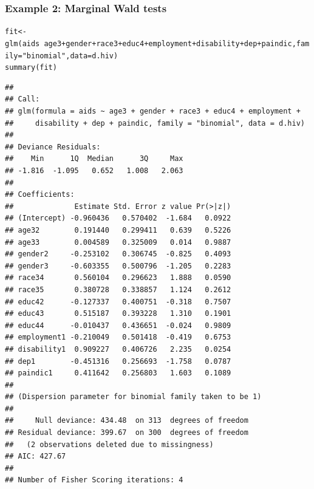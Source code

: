 \documentclass[extsize,handout,10pt]{beamer}\usepackage[]{graphicx}\usepackage[]{color}
\makeatletter
\newcommand{\hlstr}[1]{\textcolor[rgb]{1,0.4,0.2}{#1}}%
\newcommand{\hlopt}[1]{\textcolor[rgb]{0.251,0.251,0.251}{#1}}%
\newcommand{\hlstd}[1]{\textcolor[rgb]{0.251,0.251,0.251}{#1}}%
\newcommand{\hlkwb}[1]{\textcolor[rgb]{0,0.439,0.902}{#1}}%
\newcommand{\hlkwc}[1]{\textcolor[rgb]{0.188,0.941,0.314}{#1}}%
\newcommand{\hlkwd}[1]{\textcolor[rgb]{0.69,0.188,0.941}{#1}}%
\newenvironment{kframe}{%
 \def\at@end@of@kframe{}%
 \ifinner\ifhmode%
  \def\at@end@of@kframe{\end{minipage}}%
  \begin{minipage}{\columnwidth}%
 \fi\fi%
 \def\FrameCommand##1{\hskip\@totalleftmargin \hskip-\fboxsep
 \colorbox{shadecolor}{##1}\hskip-\fboxsep
     \hskip-\linewidth \hskip-\@totalleftmargin \hskip\columnwidth}%
 \MakeFramed {\advance\hsize-\width
   \@totalleftmargin\z@ \linewidth\hsize
   \@setminipage}}%
 {\par\unskip\endMakeFramed%
 \at@end@of@kframe}
\newenvironment{knitrout}{}{} %
\makeatother
\begin{document}
\begin{frame}[fragile]
  \frametitle{Example 2: Marginal Wald tests} 



\begin{knitrout}\tiny
{}\color{fgcolor}\begin{kframe}
\begin{alltt}
\hlstd{fit} \hlkwb{<-} \hlkwd{glm}\hlstd{(aids}\hlopt{~}\hlstd{age3}\hlopt{+}\hlstd{gender}\hlopt{+}\hlstd{race3}\hlopt{+}\hlstd{educ4}\hlopt{+}\hlstd{employment}\hlopt{+}\hlstd{disability}\hlopt{+}\hlstd{dep}\hlopt{+}\hlstd{paindic,} \hlkwc{family}\hlstd{=}\hlstr{"binomial"}\hlstd{,}\hlkwc{data}\hlstd{=d.hiv)}
\hlkwd{summary}\hlstd{(fit)}
\end{alltt}
\begin{verbatim}
## 
## Call:
## glm(formula = aids ~ age3 + gender + race3 + educ4 + employment + 
##     disability + dep + paindic, family = "binomial", data = d.hiv)
## 
## Deviance Residuals: 
##    Min      1Q  Median      3Q     Max  
## -1.816  -1.095   0.652   1.008   2.063  
## 
## Coefficients:
##              Estimate Std. Error z value Pr(>|z|)
## (Intercept) -0.960436   0.570402  -1.684   0.0922
## age32        0.191440   0.299411   0.639   0.5226
## age33        0.004589   0.325009   0.014   0.9887
## gender2     -0.253102   0.306745  -0.825   0.4093
## gender3     -0.603355   0.500796  -1.205   0.2283
## race34       0.560104   0.296623   1.888   0.0590
## race35       0.380728   0.338857   1.124   0.2612
## educ42      -0.127337   0.400751  -0.318   0.7507
## educ43       0.515187   0.393228   1.310   0.1901
## educ44      -0.010437   0.436651  -0.024   0.9809
## employment1 -0.210049   0.501418  -0.419   0.6753
## disability1  0.909227   0.406726   2.235   0.0254
## dep1        -0.451316   0.256693  -1.758   0.0787
## paindic1     0.411642   0.256803   1.603   0.1089
## 
## (Dispersion parameter for binomial family taken to be 1)
## 
##     Null deviance: 434.48  on 313  degrees of freedom
## Residual deviance: 399.67  on 300  degrees of freedom
##   (2 observations deleted due to missingness)
## AIC: 427.67
## 
## Number of Fisher Scoring iterations: 4
\end{verbatim}
\end{kframe}
\end{knitrout}


\end{frame}
\end{document}
